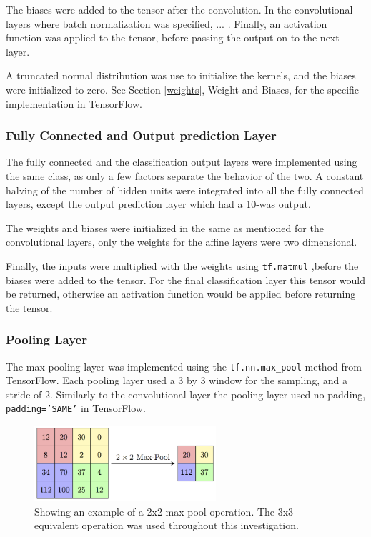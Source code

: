 \documentclass[]{article}
\begin{document}
The biases were added to the tensor after the convolution. In the convolutional layers where batch normalization was specified, ... . Finally, an activation function was applied to the tensor, before passing the output on to the next layer. 

A truncated normal distribution was use to initialize the kernels, and the biases were initialized to zero. See Section \ref{weights}, Weight and Biases, for the specific implementation in TensorFlow. 

\subsubsection{Fully Connected and Output prediction Layer}

The fully connected and the classification output layers were implemented using the same class, as only a few factors separate the behavior of the two. A constant halving of the number of hidden units were integrated into all the fully connected layers, except the output prediction layer which had a 10-was output.

The weights and biases were initialized in the same as mentioned for the convolutional layers, only the weights for the affine layers were two dimensional. 

Finally, the inputs were multiplied with the weights using \texttt{tf.matmul} ,before the biases were added to the tensor. For the final classification layer this tensor would be returned, otherwise an activation function would be applied before returning the tensor.

\subsubsection{Pooling Layer}

The max pooling layer was implemented using the \texttt{tf.nn.max\_pool} method from TensorFlow. Each pooling layer used a 3 by 3 window for the sampling, and a stride of 2. Similarly to the convolutional layer the pooling layer used no padding, \texttt{padding='SAME'} in TensorFlow. 

\begin{figure}[h]
	\centering
	\includegraphics[width=0.6\textwidth]{pool}
	\caption{Showing an example of a 2x2 max pool operation. The 3x3 equivalent operation was used throughout this investigation.}
	\label{pool}
	\centering
\end{figure}
\end{document}
